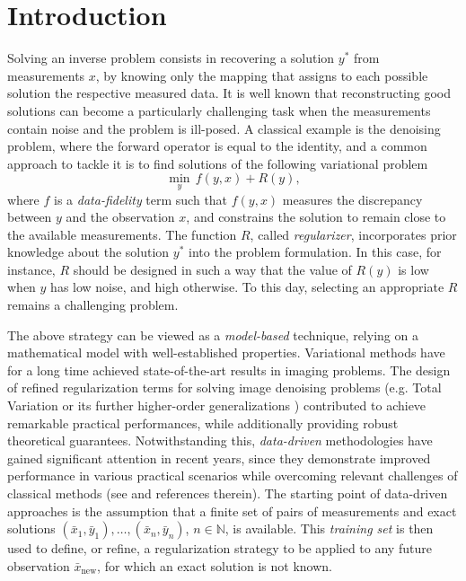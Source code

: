\documentclass[onefignum,onetabnum]{siamonline250211}
\newcommand{\bx}{\bar{x}}
\newcommand{\by}{\bar{y}}
\begin{document}
\section{Introduction}
Solving an inverse problem consists in recovering a solution $y^*$ from measurements $x$, by knowing only the mapping that assigns to each possible solution the respective measured data. It is well known that reconstructing good solutions can become a particularly challenging task when the measurements contain noise and the problem is ill-posed. A classical example is the denoising problem, where the forward operator is equal to the identity, and a common  approach to tackle it is to find solutions of the following variational problem
\begin{equation}\label{eq:var}
\min_{y} \, f(y, x) +R(y),
\end{equation}
where $f$ is a \emph{data-fidelity} term such that $f(y, x)$ measures the discrepancy between $y$ and the observation $x$, and constrains the solution to remain close to the available measurements. The function $R$, called \emph{regularizer}, incorporates prior knowledge about the solution $y^*$ into the problem formulation. In this case, for instance, $R$ should be designed in such a way that the value of $R(y)$ is low when $y$ has low noise, and high otherwise. To this day, selecting an appropriate $R$ remains a challenging problem. 

The above strategy can be viewed as a \emph{model-based} technique, relying on a mathematical model with well-established properties. Variational methods have for a long time achieved state-of-the-art results \cite{burgerbenning,ChambollePock2016,CombettesPesquet2021,scher} in imaging problems. The design of refined regularization terms for solving image denoising problems (e.g. Total Variation \cite{chambtv,rof} or its further higher-order generalizations \cite{Bredies_2020,tgv,chanmarqmu}) contributed to achieve remarkable practical performances, while additionally providing robust theoretical guarantees. Notwithstanding this, \emph{data-driven} methodologies have gained significant attention in recent years, since they demonstrate improved performance in various practical scenarios while overcoming relevant challenges of classical methods (see \cite{Arridge2019} and references therein). The starting point of data-driven approaches is the assumption that a finite set of pairs of measurements and exact solutions $(\bx_1, \by_1),\dots, (\bx_n, \by_n)$, $n\in\mathbb{N}$, is available. This {\em training set} is then used to define, or refine, a regularization strategy to be applied to any future observation $\bx_{\text{new}}$, for which an exact solution is not known.
\end{document}
